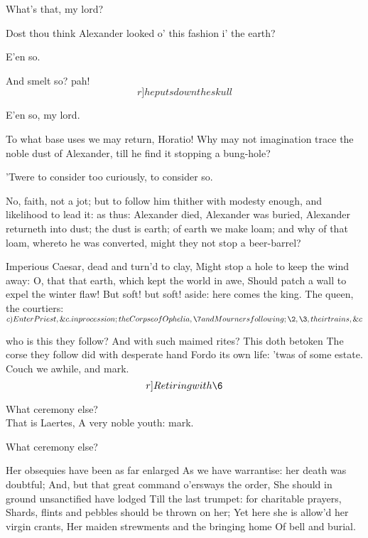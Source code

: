 \documentclass[11pt]{book}
\newenvironment {song}[1][0]
 {\Versus 
  \Locus \textus {+7em+#1em} 
  \Forma \strophae {01}
 }
 {\endVersus}
\begin{document}
\6	What's that, my lord?

\1	Dost thou think Alexander looked o' this fashion i'
	the earth?

\6	E'en so.

\1	And smelt so? pah! \[r]he puts down the skull\]

\6	E'en so, my lord.

\1	To what base uses we may return, Horatio! Why may
	not imagination trace the noble dust of Alexander,
	till he find it stopping a bung-hole?

\6	'Twere to consider too curiously, to consider so.

\1	No, faith, not a jot; but to follow him thither with
	modesty enough, and likelihood to lead it: as
	thus: Alexander died, Alexander was buried,
	Alexander returneth into dust; the dust is earth; of
	earth we make loam; and why of that loam, whereto he
	was converted, might they not stop a beer-barrel?
\endProsa

\begin {song}[-4]
	Imperious Caesar, dead and turn'd to clay,
	Might stop a hole to keep the wind away:
	O, that that earth, which kept the world in awe,
	Should patch a wall to expel the winter flaw!
\end{song}
	But soft! but soft! aside: here comes the king.
	The queen, the courtiers:\\

	\(c)Enter Priest, \&c. in procession; the Corpse of
	Ophelia,\\ \7 and Mourners following;\\ \2, \3, their trains, \&c\)

	                            who is this they follow?
	And with such maimed rites? This doth betoken
	The corse they follow did with desperate hand
	Fordo its own life: 'twas of some estate.
	Couch we awhile, and mark. \[r]Retiring with \6\]

\7	What ceremony else? \\

\1	That is Laertes,
	A very noble youth: mark.

\7	What ceremony else?

	Her obsequies have been as far enlarged
	As we have warrantise: her death was doubtful;
	And, but that great command o'ersways the order,
	She should in ground unsanctified have lodged
	Till the last trumpet: for charitable prayers,
	Shards, flints and pebbles should be thrown on her;
	Yet here she is allow'd her virgin crants,
	Her maiden strewments and the bringing home
	Of bell and burial. \\[ial.]
\end{document}
